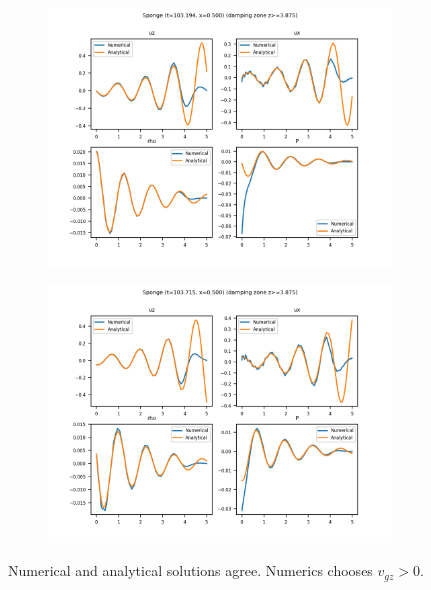 \documentclass[dvipsnames]{beamer}
\begin{document}
\begin{frame}
\begin{figure}[!h]
        \begin{subfigure}{0.37\textwidth}
            \centering
            \includegraphics[width=\textwidth]{../sims/2d_strat/agree_plots/sponge_2.png}
        \end{subfigure}
        \begin{subfigure}{0.37\textwidth}
            \centering
            \includegraphics[width=\textwidth]{../sims/2d_strat/agree_plots/sponge_3.png}
        \end{subfigure}
        \caption{Numerical and analytical solutions agree. Numerics chooses
        $v_{gz} > 0$.}\label{fig:sponge_agree}
    \end{figure}
\end{frame}
\end{document}
